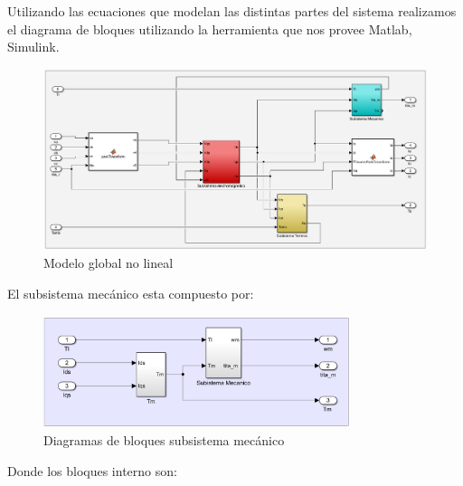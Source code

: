 \documentclass{article}
\begin{document}

Utilizando las ecuaciones que modelan las distintas partes del sistema realizamos el 
diagrama de bloques utilizando la herramienta que nos provee Matlab, Simulink.

\begin{figure}[H]
    \centering
    \includegraphics[width=1\textwidth]{no_lineal.png}
    \caption{Modelo global no lineal}
\end{figure}

El subsistema mecánico esta compuesto por:

\begin{figure}[H]
    \centering
    \includegraphics[width=0.8\textwidth]{sub_mecanico.png}
    \caption{Diagramas de bloques subsistema mecánico}
\end{figure}

Donde los bloques interno son:
\end{document}
